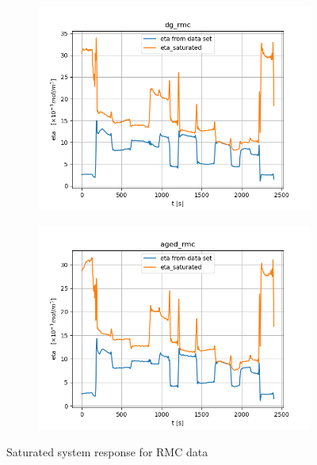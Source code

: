 \begin{figure}[H]
        \begin{minipage}{0.49\textwidth}
                \begin{figure}[H]
                        \centering
                        \includegraphics[width=\textwidth]{./figs/14_figs/bounded_eta_plots/eta_bounds_dg_rmc.png}
                \end{figure}
        \end{minipage}
        \begin{minipage}{0.49\textwidth}
                \begin{figure}[H]
                        \centering
                        \includegraphics[width=\textwidth]{./figs/14_figs/bounded_eta_plots/eta_bounds_aged_rmc.png}
                \end{figure}
        \end{minipage}
        \caption{Saturated system response for RMC data}
\end{figure}


